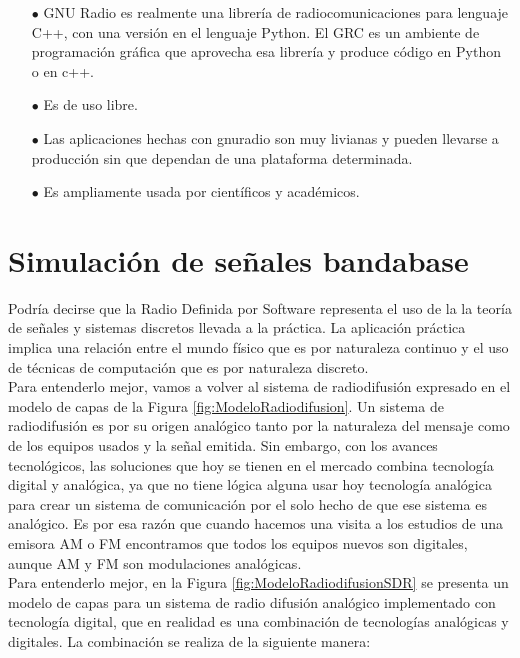 \begin{itemize}
	\item [$\bullet$] GNU Radio es realmente una librería de radiocomunicaciones para lenguaje C++, con una versión en el lenguaje Python. El GRC es un ambiente de programación gráfica que aprovecha esa librería y produce código en Python o en c++.
    \item [$\bullet$] Es de uso libre.
    \item [$\bullet$] Las aplicaciones hechas con gnuradio son muy livianas y pueden llevarse a producción sin que dependan de una plataforma determinada.
     \item [$\bullet$] Es ampliamente usada por científicos y académicos.
\end{itemize}


\section{Simulación de señales bandabase}

Podría decirse que la Radio Definida por Software representa el uso de la la teoría de señales y sistemas discretos llevada a la práctica. La aplicación práctica implica una relación entre el mundo físico que es por naturaleza continuo y el uso de técnicas de computación que es por naturaleza discreto.\\

Para entenderlo mejor, vamos a volver al sistema de radiodifusión expresado en el modelo de capas de la Figura \ref{fig:ModeloRadiodifusion}. Un sistema de radiodifusión es por su origen analógico tanto por la naturaleza del mensaje como de los equipos usados y la señal emitida. Sin embargo, con los avances tecnológicos, las soluciones que hoy se tienen en el mercado combina tecnología digital y analógica, ya que no tiene lógica alguna usar hoy tecnología analógica para crear un sistema de comunicación por el solo hecho de que ese sistema es analógico. Es por esa razón que cuando hacemos una visita a los estudios de una emisora AM o FM encontramos que todos los equipos nuevos son digitales, aunque AM y FM son modulaciones analógicas.\\
Para entenderlo mejor, en la Figura \ref{fig:ModeloRadiodifusionSDR} se presenta un modelo de capas para un  sistema de radio difusión analógico implementado con tecnología digital, que en realidad es una combinación de tecnologías analógicas y digitales. La combinación se realiza de la siguiente manera:

